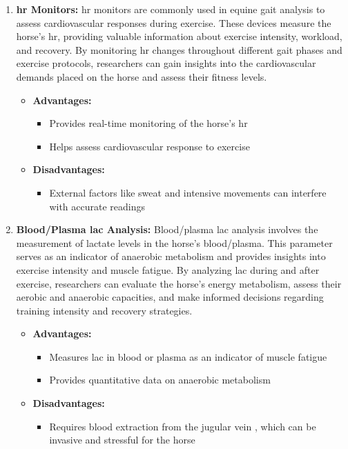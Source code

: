 \begin{enumerate}
\item \textbf{\gls{hr} Monitors:} \gls{hr} monitors are commonly used in equine gait analysis to assess cardiovascular responses during exercise. These devices measure the horse's \gls{hr}, providing valuable information about exercise intensity, workload, and recovery. By monitoring \gls{hr} changes throughout different gait phases and exercise protocols, researchers can gain insights into the cardiovascular demands placed on the horse and assess their fitness levels.
\begin{itemize}
\item[] \textbf{\small Advantages:}
\begin{itemize}
\item Provides real-time monitoring of the horse's \gls{hr}
\item Helps assess cardiovascular response to exercise
\end{itemize}
\item[] \textbf{\small Disadvantages:}
\begin{itemize}
\item External factors like sweat and intensive movements can interfere with accurate readings
\end{itemize}
\end{itemize}

\item \textbf{Blood/Plasma \gls{lac} Analysis:} Blood/plasma \gls{lac} analysis involves the measurement of lactate levels in the horse's blood/plasma. This parameter serves as an indicator of anaerobic metabolism and provides insights into exercise intensity and muscle fatigue. By analyzing \gls{lac} during and after exercise, researchers can evaluate the horse's energy metabolism, assess their aerobic and anaerobic capacities, and make informed decisions regarding training intensity and recovery strategies.
\begin{itemize}
\item[] \textbf{\small Advantages:}
\begin{itemize}
\item Measures \gls{lac} in blood or plasma as an indicator of muscle fatigue
\item Provides quantitative data on anaerobic metabolism
\end{itemize}
\item[] \textbf{\small Disadvantages:}
\begin{itemize}
\item Requires blood extraction from the jugular vein \cite{munsters_2014_exercise}, which can be invasive and stressful for the horse \cite{JANSEN200938}
\end{itemize}
\end{itemize}


\end{enumerate}
